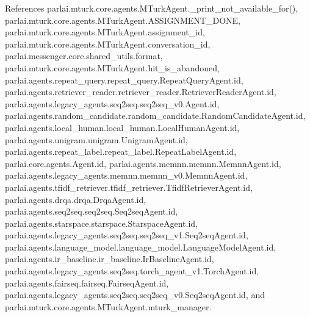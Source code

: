 References parlai.\+mturk.\+core.\+agents.\+M\+Turk\+Agent.\+\_\+print\+\_\+not\+\_\+available\+\_\+for(), parlai.\+mturk.\+core.\+agents.\+M\+Turk\+Agent.\+A\+S\+S\+I\+G\+N\+M\+E\+N\+T\+\_\+\+D\+O\+NE, parlai.\+mturk.\+core.\+agents.\+M\+Turk\+Agent.\+assignment\+\_\+id, parlai.\+mturk.\+core.\+agents.\+M\+Turk\+Agent.\+conversation\+\_\+id, parlai.\+messenger.\+core.\+shared\+\_\+utils.\+format, parlai.\+mturk.\+core.\+agents.\+M\+Turk\+Agent.\+hit\+\_\+is\+\_\+abandoned, parlai.\+agents.\+repeat\+\_\+query.\+repeat\+\_\+query.\+Repeat\+Query\+Agent.\+id, parlai.\+agents.\+retriever\+\_\+reader.\+retriever\+\_\+reader.\+Retriever\+Reader\+Agent.\+id, parlai.\+agents.\+legacy\+\_\+agents.\+seq2seq.\+seq2seq\+\_\+v0.\+Agent.\+id, parlai.\+agents.\+random\+\_\+candidate.\+random\+\_\+candidate.\+Random\+Candidate\+Agent.\+id, parlai.\+agents.\+local\+\_\+human.\+local\+\_\+human.\+Local\+Human\+Agent.\+id, parlai.\+agents.\+unigram.\+unigram.\+Unigram\+Agent.\+id, parlai.\+agents.\+repeat\+\_\+label.\+repeat\+\_\+label.\+Repeat\+Label\+Agent.\+id, parlai.\+core.\+agents.\+Agent.\+id, parlai.\+agents.\+memnn.\+memnn.\+Memnn\+Agent.\+id, parlai.\+agents.\+legacy\+\_\+agents.\+memnn.\+memnn\+\_\+v0.\+Memnn\+Agent.\+id, parlai.\+agents.\+tfidf\+\_\+retriever.\+tfidf\+\_\+retriever.\+Tfidf\+Retriever\+Agent.\+id, parlai.\+agents.\+drqa.\+drqa.\+Drqa\+Agent.\+id, parlai.\+agents.\+seq2seq.\+seq2seq.\+Seq2seq\+Agent.\+id, parlai.\+agents.\+starspace.\+starspace.\+Starspace\+Agent.\+id, parlai.\+agents.\+legacy\+\_\+agents.\+seq2seq.\+seq2seq\+\_\+v1.\+Seq2seq\+Agent.\+id, parlai.\+agents.\+language\+\_\+model.\+language\+\_\+model.\+Language\+Model\+Agent.\+id, parlai.\+agents.\+ir\+\_\+baseline.\+ir\+\_\+baseline.\+Ir\+Baseline\+Agent.\+id, parlai.\+agents.\+legacy\+\_\+agents.\+seq2seq.\+torch\+\_\+agent\+\_\+v1.\+Torch\+Agent.\+id, parlai.\+agents.\+fairseq.\+fairseq.\+Fairseq\+Agent.\+id, parlai.\+agents.\+legacy\+\_\+agents.\+seq2seq.\+seq2seq\+\_\+v0.\+Seq2seq\+Agent.\+id, and parlai.\+mturk.\+core.\+agents.\+M\+Turk\+Agent.\+mturk\+\_\+manager.

